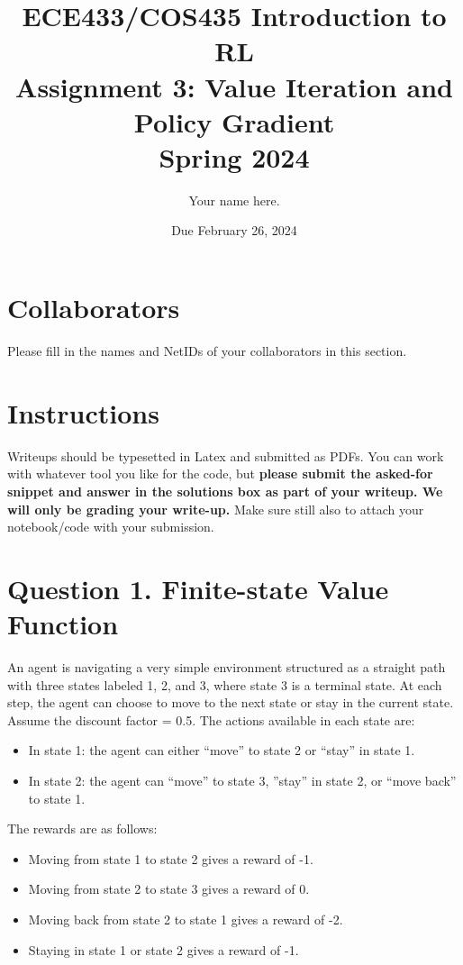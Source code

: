 \documentclass[12pt]{article}
\date{Due February 26, 2024}
\author{\begin{fillme}[width=0.3\textwidth]
 Your name here.
\end{fillme}} %
\title{ECE433/COS435 Introduction to RL\\
  Assignment 3: Value Iteration and Policy Gradient\\
  Spring 2024\\
}
\begin{document}
  \maketitle
  \section*{Collaborators}
\begin{fillme}
 Please fill in the names and NetIDs of your collaborators in this section.
\end{fillme}

\section*{Instructions}

Writeups should be typesetted in Latex and submitted as PDFs. You can work with whatever tool you like for the code, but \textbf{please submit the asked-for snippet and answer in the solutions box as part of your writeup. We will only be grading your write-up.} Make sure still also to attach your notebook/code with your submission.

\section*{Question 1. Finite-state Value Function}
An agent is navigating a very simple environment structured as a straight path with three states labeled
1, 2, and 3, where state 3 is a terminal state. At each step, the agent can choose to move to the next state
or stay in the current state. Assume the discount factor = 0.5.
The actions available in each state are: 
\begin{itemize}
    \item In state 1: the agent can either “move” to state 2 or “stay” in state 1. 
    \item In state 2: the agent can “move” to state 3, ”stay” in state 2, or “move back” to state 1.
\end{itemize}
The rewards are as follows:\begin{itemize}
    \item Moving from state 1 to state 2 gives a reward of -1.
    \item Moving from state 2 to state 3 gives a reward of 0. 
    \item Moving back from state 2 to state 1 gives a reward of -2.
    \item Staying in state 1 or state 2 gives a reward of -1.
\end{itemize}
\end{document}
